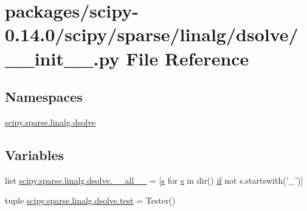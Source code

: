 \hypertarget{packages_2scipy-0_814_80_2scipy_2sparse_2linalg_2dsolve_2____init_____8py}{}\section{packages/scipy-\/0.14.0/scipy/sparse/linalg/dsolve/\+\_\+\+\_\+init\+\_\+\+\_\+.py File Reference}
\label{packages_2scipy-0_814_80_2scipy_2sparse_2linalg_2dsolve_2____init_____8py}
\subsection*{Namespaces}
\begin{DoxyCompactItemize}
\item 
 \hyperlink{namespacescipy_1_1sparse_1_1linalg_1_1dsolve}{scipy.\+sparse.\+linalg.\+dsolve}
\end{DoxyCompactItemize}
\subsection*{Variables}
\begin{DoxyCompactItemize}
\item 
list \hyperlink{namespacescipy_1_1sparse_1_1linalg_1_1dsolve_ac7dd37dd0830e4f58008ecb5f4eac711}{scipy.\+sparse.\+linalg.\+dsolve.\+\_\+\+\_\+all\+\_\+\+\_\+} = \mbox{[}\hyperlink{indexexpr_8h_ae024b0db549122b44c349ae28ec990dc}{s} for \hyperlink{indexexpr_8h_ae024b0db549122b44c349ae28ec990dc}{s} in dir() \hyperlink{minmax_8h_a30a0ee9fee303f01d9c5e6f669e0dfe9}{if} not s.\+startswith('\+\_\+')\mbox{]}
\item 
tuple \hyperlink{namespacescipy_1_1sparse_1_1linalg_1_1dsolve_a475f1f29c3c7fabbfd47640fe5db8e08}{scipy.\+sparse.\+linalg.\+dsolve.\+test} = Tester()
\end{DoxyCompactItemize}

